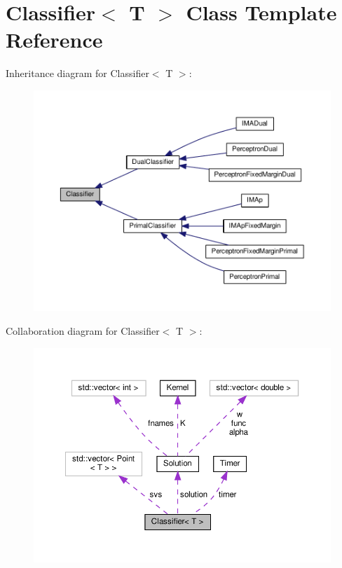 \hypertarget{class_classifier}{}\section{Classifier$<$ T $>$ Class Template Reference}
\label{class_classifier}


Inheritance diagram for Classifier$<$ T $>$\+:\nopagebreak
\begin{figure}[H]
\begin{center}
\leavevmode
\includegraphics[width=350pt]{class_classifier__inherit__graph}
\end{center}
\end{figure}


Collaboration diagram for Classifier$<$ T $>$\+:
\nopagebreak
\begin{figure}[H]
\begin{center}
\leavevmode
\includegraphics[width=350pt]{class_classifier__coll__graph}
\end{center}
\end{figure}
